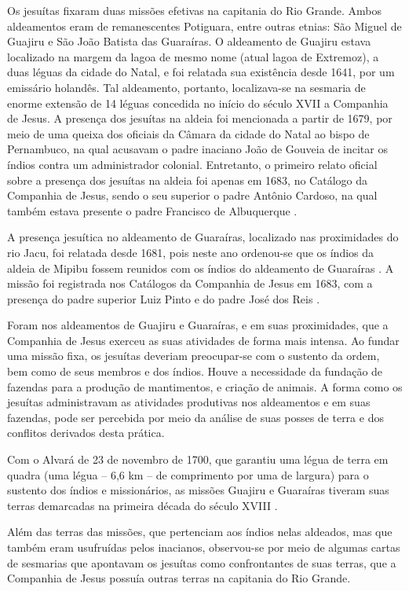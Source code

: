 \begin{refsection}
Os jesuítas fixaram duas missões efetivas na capitania do Rio Grande. Ambos aldeamentos eram de remanescentes Potiguara, entre outras etnias: São Miguel de Guajiru e São João Batista das Guaraíras. O aldeamento de Guajiru estava localizado na margem da lagoa de mesmo nome (atual lagoa de Extremoz), a duas léguas da cidade do Natal, e foi relatada sua existência desde 1641, por um emissário holandês. Tal aldeamento, portanto, localizava-se na sesmaria de enorme extensão de 14 léguas concedida no início do século XVII a Companhia de Jesus. A presença dos jesuítas na aldeia foi mencionada a partir de 1679, por meio de uma queixa dos oficiais da Câmara da cidade do Natal ao bispo de Pernambuco, na qual acusavam o padre inaciano João de Gouveia de incitar os índios contra um administrador colonial. Entretanto, o primeiro relato oficial sobre a presença dos jesuítas na aldeia foi apenas em 1683, no Catálogo da Companhia de Jesus, sendo o seu superior o padre Antônio Cardoso, na qual também estava presente o padre Francisco de Albuquerque \cite[p.~170]{Lopes2003}.  

A presença jesuítica no aldeamento de Guaraíras, localizado nas proximidades do rio Jacu, foi relatada desde 1681, pois neste ano ordenou-se que os índios da aldeia de Mipibu fossem reunidos com os índios do aldeamento de Guaraíras \cite[p.~35]{Lemos1912}. A missão foi registrada nos Catálogos da Companhia de Jesus em 1683, com a presença do padre superior Luiz Pinto e do padre José dos Reis \cite[p.~172]{Lopes2003}.  

Foram nos aldeamentos de Guajiru e Guaraíras, e em suas proximidades, que a Companhia de Jesus exerceu as suas atividades de forma mais intensa. Ao fundar uma missão fixa, os jesuítas deveriam preocupar-se com o sustento da ordem, bem como de seus membros e dos índios. Houve a necessidade da fundação de fazendas para a produção de mantimentos, e criação de animais. A forma como os jesuítas administravam as atividades produtivas nos aldeamentos e em suas fazendas, pode ser percebida por meio da análise de suas posses de terra e dos conflitos derivados desta prática.  

Com o Alvará de 23 de novembro de 1700, que garantiu uma légua de terra em quadra (uma légua -- 6,6 km -- de comprimento por uma de largura) para o sustento dos índios e missionários, as missões Guajiru e Guaraíras tiveram suas terras demarcadas na primeira década do século XVIII \cites[p.~111--112]{Cascudo1984}[p.~44]{Lopes2005}.  

Além das terras das missões, que pertenciam aos índios nelas aldeados, mas que também eram usufruídas pelos inacianos, observou-se por meio de algumas cartas de sesmarias que apontavam os jesuítas como confrontantes de suas terras, que a Companhia de Jesus possuía outras terras na capitania do Rio Grande.   


\end{refsection}
